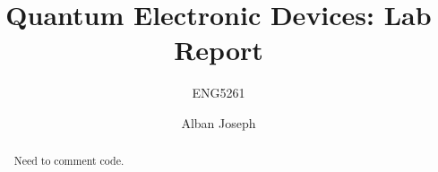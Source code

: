 \documentclass{report}
\title{Quantum Electronic Devices: Lab Report}
\author{ENG5261}
\date{Alban Joseph}
\begin{document}
\maketitle

\begin{abstract}
Need to comment code.
\end{abstract}






\end{document}
